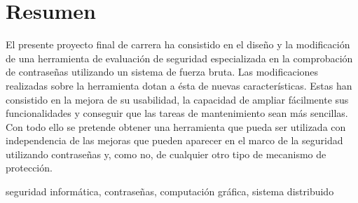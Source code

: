 \section*{Resumen}

El presente proyecto final de carrera ha consistido en el diseño y la modificación de una herramienta de evaluación de seguridad especializada en la comprobación de contraseñas utilizando un sistema de fuerza bruta. Las modificaciones realizadas sobre la herramienta dotan a ésta de nuevas características. Estas han consistido en la mejora de su usabilidad, la capacidad de ampliar fácilmente sus funcionalidades y conseguir que las tareas de mantenimiento sean más sencillas. Con todo ello se pretende obtener una herramienta que pueda ser utilizada con independencia de las mejoras que pueden aparecer en el marco de la seguridad utilizando contraseñas y, como no, de cualquier otro tipo de mecanismo de protección.

\begin{keywords}
seguridad informática, contraseñas, computación gráfica, sistema distribuido
\end{keywords}